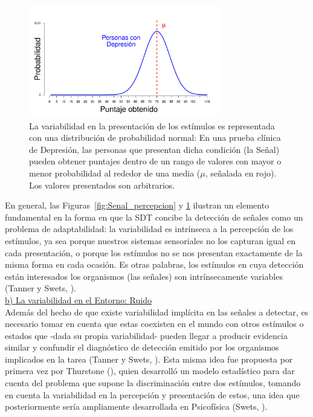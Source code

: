 \begin{figure}[th]
\centering
\includegraphics[width=0.75\textwidth]{Figures/Signal_Presentation} 
\caption[Variabilidad en la presentación de los estímulos]{La variabilidad en la presentación de los estímulos es representada con una distribución de probabilidad normal: En una prueba clínica de Depresión, las personas que presentan dicha condición (la Señal) pueden obtener puntajes dentro de un rango de valores con mayor o menor probabilidad al rededor de una media ($\mu$, señalada en rojo). Los valores presentados son arbitrarios.}
\label{fig:Senal_presentacion}
\end{figure}


En general, las Figuras~\ref{fig:Senal_percepcion} y \ref{fig:Senal_presentacion} ilustran un elemento fundamental en la forma en que la SDT concibe la detección de señales como un problema de adaptabilidad: la variabilidad es intrínseca a la percepción de los estímulos, ya sea porque nuestros sistemas sensoriales no los capturan igual en cada presentación, o porque los estímulos no se nos presentan exactamente de la misma forma en cada ocasión. Es otras palabras, los estímulos en cuya detección están interesados los organismos (las señales) son intrínsecamente variables (Tanner y Swets, \citeyear{Tanner1954}).\\

    \underline{b) La variabilidad en el Entorno: Ruido}\\

Además del hecho de que existe variabilidad implícita en las señales a detectar, es necesario tomar en cuenta que estas coexisten en el mundo con otros estímulos o estados que -dada su propia variabilidad- pueden llegar a producir evidencia similar y confundir el diagnóstico de detección emitido por los organismos implicados en la tarea (Tanner y Swets, \citeyear{Tanner1954}). Esta misma idea fue propuesta por primera vez por Thurstone (\citeyear{Thurstone1927}), quien desarrolló un modelo estadístico para dar cuenta del problema que supone la discriminación entre dos estímulos, tomando en cuenta la variabilidad en la percepción y presentación de estos, una idea que posteriormente sería ampliamente desarrollada en Psicofísica (Swets, \citeyear{Swets1973}).\\

